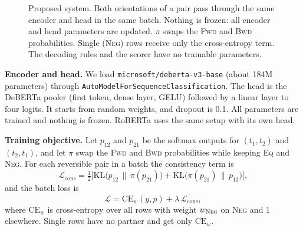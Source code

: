 \documentclass[10pt,a4paper,twocolumn]{article}
\newcommand{\Eq}{\textsc{Eq}}
\newcommand{\Fwd}{\textsc{Fwd}}
\newcommand{\Bwd}{\textsc{Bwd}}
\newcommand{\Neg}{\textsc{Neg}}
\begin{document}
\begin{figure}[!t]
\caption{Proposed system. Both orientations of a pair pass through the same encoder and head in the same batch. Nothing is frozen: all encoder and head parameters are updated. $\pi$ swaps the \Fwd{} and \Bwd{} probabilities. Single (\Neg) rows receive only the cross-entropy term. The decoding rules and the scorer have no trainable parameters.}
\label{fig:arch}
\end{figure}

\textbf{Encoder and head.} We load \texttt{microsoft/deberta-v3-base} (about 184M parameters) through \texttt{AutoModelForSequenceClassification}. The head is the DeBERTa pooler (first token, dense layer, GELU) followed by a linear layer to four logits. It starts from random weights, and dropout is 0.1. All parameters are trained and nothing is frozen. RoBERTa uses the same setup with its own head.

\textbf{Training objective.} Let $p_{12}$ and $p_{21}$ be the softmax outputs for $(t_1,t_2)$ and $(t_2,t_1)$, and let $\pi$ swap the \Fwd{} and \Bwd{} probabilities while keeping \Eq{} and \Neg. For each reversible pair in a batch the consistency term is
\begin{equation}
\mathcal{L}_{\mathrm{cons}}=\tfrac12\Big[\mathrm{KL}\big(p_{12}\,\|\,\pi(p_{21})\big)+\mathrm{KL}\big(\pi(p_{21})\,\|\,p_{12}\big)\Big],
\end{equation}
and the batch loss is
\begin{equation}
\mathcal{L}=\mathrm{CE}_w(y,p)+\lambda\,\overline{\mathcal{L}_{\mathrm{cons}}},
\end{equation}
where $\mathrm{CE}_w$ is cross-entropy over all rows with weight $w_{\Neg}$ on \Neg{} and 1 elsewhere. Single rows have no partner and get only $\mathrm{CE}_w$.
\end{document}
